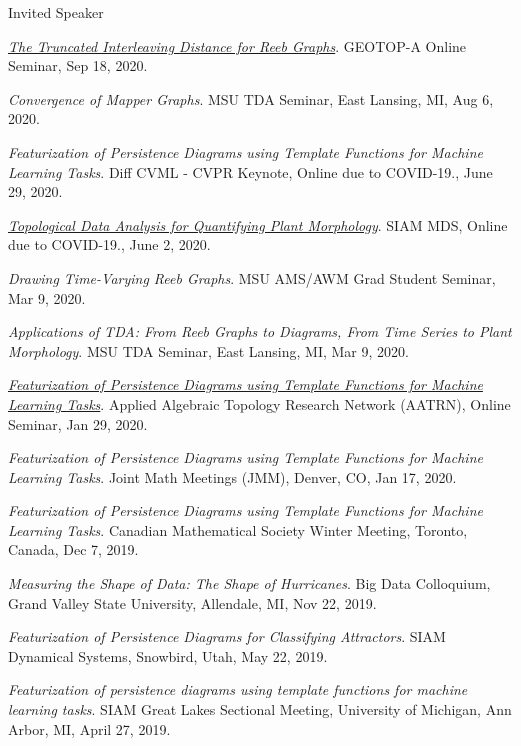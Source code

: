 \documentclass{resume} %
\begin{document}
\begin{rSection}{Invited Speaker}
\begin{etaremune}
\item\emph{\href{https://youtu.be/nyO4KQTmwzU}{The Truncated Interleaving Distance for Reeb Graphs}}. GEOTOP-A Online Seminar, Sep 18, 2020. 

\item\emph{Convergence of Mapper Graphs}. MSU TDA Seminar, East Lansing, MI, Aug 6, 2020. 

\item\emph{Featurization of Persistence Diagrams using Template Functions for Machine Learning Tasks}. Diff CVML - CVPR Keynote, Online due to COVID-19., June 29, 2020. 

\item\emph{\href{https://youtu.be/2mscXkz_o4A}{Topological Data Analysis for Quantifying Plant Morphology}}. SIAM MDS, Online due to COVID-19., June 2, 2020. 

\item\emph{Drawing Time-Varying Reeb Graphs}. MSU AMS/AWM Grad Student Seminar, Mar 9, 2020. 

\item\emph{Applications of TDA: From Reeb Graphs to Diagrams, From Time Series to Plant Morphology}. MSU TDA Seminar, East Lansing, MI, Mar 9, 2020. 

\item\emph{\href{https://youtu.be/Moh9lF4UVs4}{Featurization of Persistence Diagrams using Template Functions for Machine Learning Tasks}}. Applied Algebraic Topology Research Network (AATRN), Online Seminar, Jan 29, 2020. 

\item\emph{Featurization of Persistence Diagrams using Template Functions for Machine Learning Tasks}. Joint Math Meetings (JMM), Denver, CO, Jan 17, 2020. 

\item\emph{Featurization of Persistence Diagrams using Template Functions for Machine Learning Tasks}. Canadian Mathematical Society Winter Meeting, Toronto, Canada, Dec 7, 2019. 

\item\emph{Measuring the Shape of Data: The Shape of Hurricanes}. Big Data Colloquium, Grand Valley State University, Allendale, MI, Nov 22, 2019. 

\item\emph{Featurization of Persistence Diagrams for Classifying Attractors}. SIAM Dynamical Systems, Snowbird, Utah, May 22, 2019. 

\item\emph{Featurization of persistence diagrams using template functions for machine learning tasks}. SIAM Great Lakes Sectional Meeting, University of Michigan, Ann Arbor, MI, April 27, 2019. 


\end{etaremune}
\end{rSection}
\end{document}
